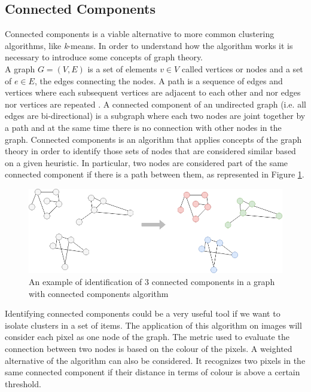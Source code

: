 \documentclass{usiinftr}
\begin{document}
\subsection{Connected Components}
Connected components is a viable alternative to more common clustering algorithms, like \textit{k}-means. In order to understand how the algorithm works it is necessary to introduce some concepts of graph theory. \\
A graph $G=(V,E)$ is a set of elements $v \in V$ called vertices or nodes and a set of $e \in E$, the edges connecting the nodes. A path is a sequence of edges and vertices where each subsequent vertices are adjacent to each other and nor edges nor vertices are repeated \cite{12}. 
A connected component of an undirected graph (i.e. all edges are bi-directional)  is a subgraph where each two nodes are joint together by a path and at the same time  there is no connection with other nodes in the graph. 
Connected components is an algorithm that applies concepts of the graph theory in order to identify those sets of nodes that are considered similar based on a given heuristic. In particular, two nodes are considered part of the same connected component if there is a path between them, as represented in Figure \ref{fig:2}. \\
\begin{figure}[h]
	\centering
	\includegraphics[width=0.6\linewidth]{img/conn_comp}
	\caption{An example of identification of 3 connected components in a graph with connected components algorithm}
	\label{fig:2}
\end{figure}
\newpage
\noindent
Identifying connected components could be a very useful tool if we want to isolate clusters in a set of items. 
The application of this algorithm on images will consider each pixel as one node of the graph. The metric used to evaluate the connection between two nodes is based on the colour of the pixels. A weighted alternative of the algorithm can also be considered. It recognizes two pixels in the same connected component if their distance in terms of colour is above a certain threshold.\\
\end{document}
